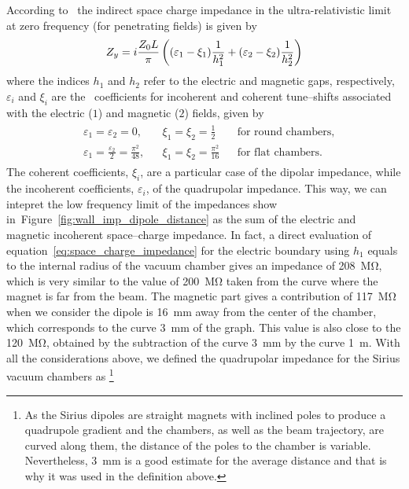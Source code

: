     According to~ the indirect space charge impedance in the ultra-relativistic limit at zero frequency (for penetrating fields) is given by
    \begin{align}\label{eq:space_charge_impedance}
        Z_y = i\frac{Z_0L}{\pi}\left((\varepsilon_1-\xi_1)\frac{1}{h_1^2} +
                                         (\varepsilon_2-\xi_2)\frac{1}{h_2^2}\right)
    \end{align}
    where the indices $h_1$ and $h_2$ refer to the electric and magnetic gaps, respectively, $\varepsilon_i$ and $\xi_i$ are the~ coefficients for incoherent and coherent tune--shifts associated with the electric ($1$) and magnetic ($2$) fields, given by
    \begin{align}\label{eq:laslett_coefficients}
        \begin{aligned}
            &\varepsilon_1 = \varepsilon_2 = 0, & &
            \xi_1 = \xi_2 = \frac12 & &
            \text{for round chambers},\\
            &\varepsilon_1=\frac{\varepsilon_2}{2} = \frac{\pi^2}{48}, & &
            \xi_1 = \xi_2 = \frac{\pi^2}{16} & &
            \text{for flat chambers.}
        \end{aligned}
    \end{align}
    The coherent coefficients, $\xi_i$, are a particular case of the dipolar impedance, while the incoherent coefficients, $\varepsilon_i$, of the quadrupolar impedance. This way, we can intepret the low frequency limit of the impedances show in~Figure~\ref{fig:wall_imp_dipole_distance} as the sum of the electric and magnetic incoherent space--charge impedance. In fact, a direct evaluation of equation~\eqref{eq:space_charge_impedance} for the electric boundary using $h_1$ equals to the internal radius of the vacuum chamber gives an impedance of \SI{208}{\mega\ohm},
    which is very similar to the value of \SI{200}{\mega\ohm} taken from the curve where the magnet is far from the beam. The magnetic part gives a contribution of \SI{117}{\mega\ohm} when we consider the dipole is \SI{16}{\milli\meter} away from the center of the chamber, which corresponds to the curve \SI{3}{\milli\meter} of the graph. This value is also close to the \SI{120}{\mega\ohm}, obtained by the subtraction of the curve \SI{3}{\milli\meter} by the curve \SI{1}{\meter}. With all the considerations above, we defined the quadrupolar impedance for the Sirius vacuum chambers as
    \footnote{As the Sirius dipoles are straight magnets with inclined poles to produce a quadrupole gradient and the chambers, as well as the beam trajectory, are curved along them, the distance of the poles to the chamber is variable. Nevertheless, \SI{3}{\milli\meter} is a good estimate for the average distance and that is why it was used in the definition above.}
